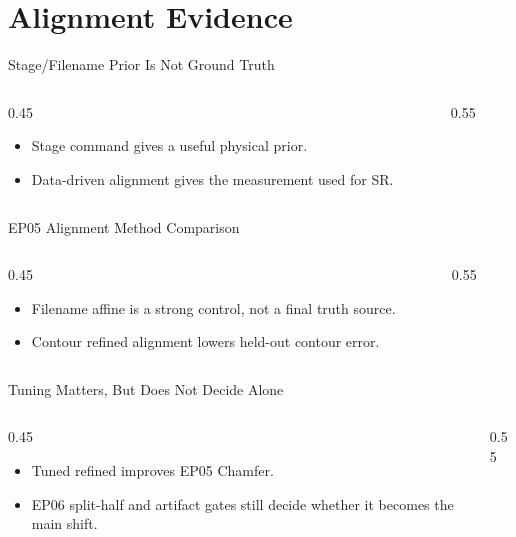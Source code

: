 \section{Alignment Evidence}

\begin{frame}{Stage/Filename Prior Is Not Ground Truth}
  \begin{columns}[c]
    \begin{column}{0.45\textwidth}
      \begin{itemize}
        \item Stage command gives a useful physical prior.
        \item Data-driven alignment gives the measurement used for SR.
      \end{itemize}
    \end{column}
    \begin{column}{0.55\textwidth}
      \centering
    \end{column}
  \end{columns}
\end{frame}

\begin{frame}{EP05 Alignment Method Comparison}
  \begin{columns}[c]
    \begin{column}{0.45\textwidth}
      \begin{itemize}
        \item Filename affine is a strong control, not a final truth source.
        \item Contour refined alignment lowers held-out contour error.
      \end{itemize}
    \end{column}
    \begin{column}{0.55\textwidth}
      \centering
    \end{column}
  \end{columns}
\end{frame}

\begin{frame}{Tuning Matters, But Does Not Decide Alone}
  \begin{columns}[c]
    \begin{column}{0.45\textwidth}
      \begin{itemize}
        \item Tuned refined improves EP05 Chamfer.
        \item EP06 split-half and artifact gates still decide whether it becomes the main shift.
      \end{itemize}
    \end{column}
    \begin{column}{0.55\textwidth}
      \centering
    \end{column}
  \end{columns}
\end{frame}

